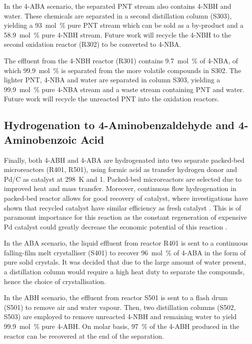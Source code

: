 In the 4-ABA scenario, the separated PNT stream also contains 4-NBH and water. These chemicals are separated in a second distillation column (S303), yielding a \SI{93}{mol\percent} pure PNT stream which can be sold as a by-product and a \SI{58.9}{mol\percent} pure 4-NBH stream. Future work will recycle the 4-NBH to the second oxidation reactor (R302) to be converted to 4-NBA.

The effluent from the 4-NBH reactor (R301) contains \SI{9.7}{mol\percent} of 4-NBA, of which \SI{99.9}{mol\percent} is separated from the more volatile compounds in S302. The lighter PNT, 4-NBA and water are separated in column S303, yielding a \SI{99.9}{mol\percent} pure 4-NBA stream and a waste stream containing PNT and water. Future work will recycle the unreacted PNT into the oxidation reactors.

\subsection{Hydrogenation to 4-Aminobenzaldehyde and 4-Aminobenzoic Acid}

Finally, both 4-ABH and 4-ABA are hydrogenated into two separate packed-bed microreactors (R401, R501), using formic acid as transfer hydrogen donor and Pd/C as catalyst at \SI{298}{\K} and \SI{1}{\atm}. Packed-bed microreactors are selected due to improved heat and mass transfer. Moreover, continuous flow hydrogenation in packed-bed reactor allows for good recovery of catalyst, where investigations have shown that recycled catalyst have similar efficiency as fresh catalyst \cite{rahman_fast_2020}. This is of paramount importance for this reaction as the constant regeneration of expensive Pd catalyst could greatly decrease the economic potential of this reaction \cite{rahman_fast_2020}. 


In the ABA scenario, the liquid effluent from reactor R401 is sent to a continuous falling-film melt crystalliser (S401) to recover \SI{96}{mol\percent} of 4-ABA in the form of pure solid crystals. It was decided that due to the large amount of water present, a distillation column would require a high heat duty to separate the compounds, hence the choice of crystallisation. %

 In the ABH scenario, the effluent from reactor S501 is sent to a flash drum (S501) to remove air and water vapour. Then, two distillation columns (S502, S503) are employed to remove unreacted 4-NBH and remaining water to yield  \SI{99.9}{mol\percent} pure 4-ABH. On molar basis, \SI{97}{\percent} of the 4-ABH produced in the reactor can be recovered at the end of the separation.

